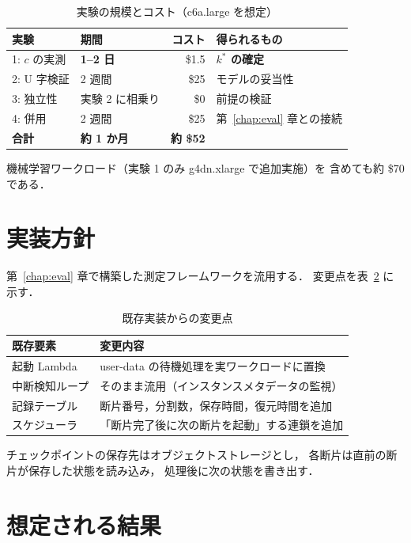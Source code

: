 \documentclass[11pt,a4paper]{ltjsreport}
\begin{document}
\begin{table}[htbp]
\centering
\caption{実験の規模とコスト（c6a.large を想定）}
\label{tab:exp_scale}
\small
\begin{tabularx}{\textwidth}{@{}llrX@{}}
\toprule
実験 & 期間 & コスト & 得られるもの \\
\midrule
1: $c$ の実測   & \textbf{1--2 日} & \$1.5 & \textbf{$k^{*}$ の確定} \\
2: U 字検証     & 2 週間 & \$25 & モデルの妥当性 \\
3: 独立性       & 実験 2 に相乗り & \$0 & 前提の検証 \\
4: 併用         & 2 週間 & \$25 & 第~\ref{chap:eval} 章との接続 \\
\midrule
\textbf{合計}   & \textbf{約 1 か月} & \textbf{約 \$52} & \\
\bottomrule
\end{tabularx}
\end{table}

機械学習ワークロード（実験 1 のみ g4dn.xlarge で追加実施）を
含めても約 \$70 である．

\section{実装方針}

第~\ref{chap:eval} 章で構築した測定フレームワークを流用する．
変更点を表~\ref{tab:impl} に示す．

\begin{table}[htbp]
\centering
\caption{既存実装からの変更点}
\label{tab:impl}
\small
\begin{tabularx}{\textwidth}{@{}lX@{}}
\toprule
既存要素 & 変更内容 \\
\midrule
起動 Lambda & user-data の待機処理を実ワークロードに置換 \\
中断検知ループ & そのまま流用（インスタンスメタデータの監視） \\
記録テーブル & 断片番号，分割数，保存時間，復元時間を追加 \\
スケジューラ & 「断片完了後に次の断片を起動」する連鎖を追加 \\
\bottomrule
\end{tabularx}
\end{table}

チェックポイントの保存先はオブジェクトストレージとし，
各断片は直前の断片が保存した状態を読み込み，
処理後に次の状態を書き出す．

\section{想定される結果}
\end{document}
